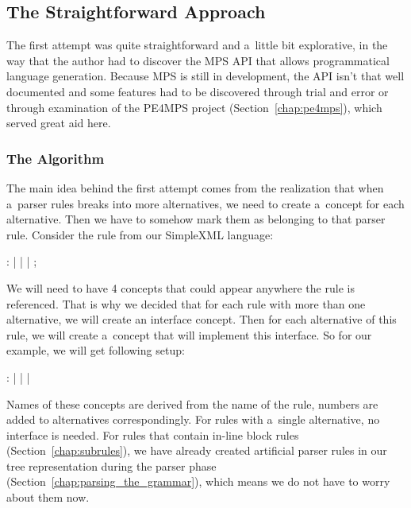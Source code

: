 \subsection{The Straightforward Approach}
\label{chap:straightforward_approach}

The first attempt was quite straightforward and a~little bit explorative, in the way that the author had to discover the MPS API that allows programmatical language generation.
Because MPS is still in development, the API isn't that well documented and some features had to be discovered through trial and error or through examination of the PE4MPS project (Section~\ref{chap:pe4mps}), which served great aid here.

\subsubsection{The Algorithm}
\label{chap:straight_algorithm}
The main idea behind the first attempt comes from the realization that when a~parser rules breaks into more alternatives, we need to create a~concept for each alternative.
Then we have to somehow mark them as belonging to that parser rule.
Consider the  rule from our SimpleXML language:

\begin{antlr}
	    :   
           |   
           |   
           |   
           ;
\end{antlr}

We will need to have 4 concepts that could appear anywhere the  rule is referenced.
That is why we decided that for each rule with more than one alternative, we will create an interface concept.
Then for each alternative of this rule, we will create a~concept that will implement this interface.
So for our  example, we will get following setup:

\begin{antlr}
	   :   
           |   
           |   
           |   
\end{antlr}

Names of these concepts are derived from the name of the rule, numbers are added to alternatives correspondingly.
For rules with a~single alternative, no interface is needed.
For rules that contain in-line block rules (Section~\ref{chap:subrules}), we have already created artificial parser rules in our tree representation during the parser phase (Section~\ref{chap:parsing_the_grammar}), which means we do not have to worry about them now.
\\

